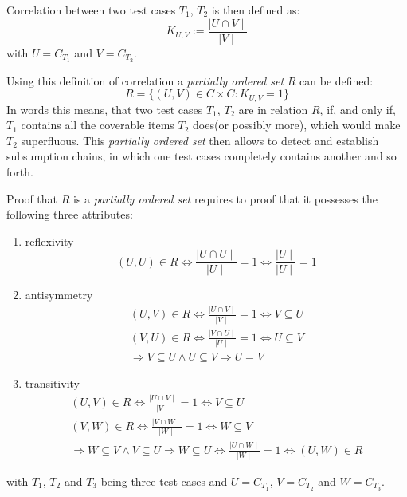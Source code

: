 Correlation between two test cases $T_{1}$, $T_{2}$ is then defined as:
\begin{equation}
K_{U,V} := \frac{\mid U \cap V \mid}{\mid V \mid}
\end{equation}
with $U = C_{T_{1}}$ and $V = C_{T_{2}}$.
\par
Using this definition of correlation a \textit{partially ordered set} $R$ can be defined:
\begin{equation}
R = \{(U,V) \in C \times C : K_{U,V} = 1 \}
\end{equation}
In words this means, that two test cases $T_{1}$, $T_{2}$ are in relation $R$, if, and only if, $T_{1}$ contains all the coverable items $T_{2}$ does(or possibly more), which would make $T_{2}$ superfluous. This \textit{partially ordered set} then allows to detect and establish subsumption chains, in which one test cases completely contains another and so forth.
\par
Proof that $R$ is a \textit{partially ordered set} requires to proof that it possesses the following three attributes:
\begin{enumerate}
\item reflexivity
	\begin{equation}
	(U,U) \in R \Leftrightarrow \frac{\mid U \cap U \mid}{\mid U \mid} = 1 \Leftrightarrow \frac{\mid U \mid}{\mid U \mid} = 1
\end{equation}

\item antisymmetry
\begin{eqnarray}
	(U,V) \in R \Leftrightarrow \frac{\mid U \cap V \mid}{\mid V \mid} = 1 \Leftrightarrow V \subseteq U \\
	(V,U) \in R \Leftrightarrow \frac{\mid V \cap U \mid}{\mid U \mid} = 1 \Leftrightarrow U \subseteq V \\
\Rightarrow	V \subseteq U \wedge U \subseteq V \Rightarrow U = V
\end{eqnarray}

\item transitivity
\begin{eqnarray}
	(U,V) \in R \Leftrightarrow \frac{\mid U \cap V \mid}{\mid V \mid} = 1 \Leftrightarrow V \subseteq U \\
	(V,W) \in R \Leftrightarrow \frac{\mid V \cap W \mid}{\mid W \mid} = 1 \Leftrightarrow W \subseteq V \\
\Rightarrow	W \subseteq V \wedge V \subseteq U \Rightarrow W \subseteq U \Leftrightarrow \frac{\mid U \cap W \mid}{\mid W \mid} = 1 \Leftrightarrow (U,W) \in R
\end{eqnarray}

\end{enumerate}
with $T_{1}$, $T_{2}$ and $T_{3}$ being three test cases and $U = C_{T_{1}}$, $V = C_{T_{2}}$ and $W = C_{T_{3}}$.

